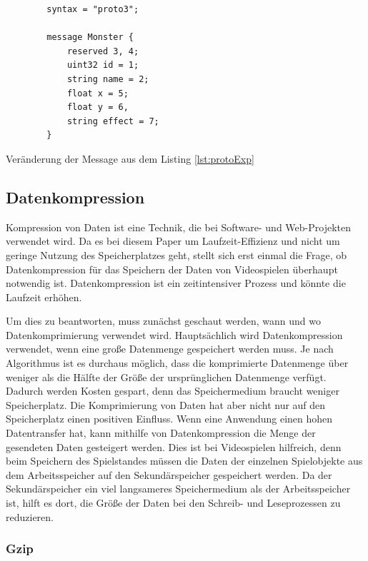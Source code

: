 \begin{listing}[htp]
    \begin{verbatim} 
        syntax = "proto3";
        
        message Monster {
            reserved 3, 4; 
            uint32 id = 1;
            string name = 2;
            float x = 5;
            float y = 6,
            string effect = 7;
        }
    \end{verbatim}
    \caption{Veränderung der Message aus dem Listing \ref{lst:protoExp}}
    \label{lst:protoReserved}
\end{listing}


\subsection{Datenkompression} \label{ssec:kompression}
Kompression von Daten ist eine Technik, die bei Software- und Web-Projekten verwendet wird. Da es bei diesem Paper um Laufzeit-Effizienz und nicht um geringe Nutzung des Speicherplatzes geht, stellt sich erst einmal die Frage, ob Datenkompression für das Speichern der Daten von Videospielen überhaupt notwendig ist. Datenkompression ist ein zeitintensiver Prozess und könnte die Laufzeit erhöhen.

Um dies zu beantworten, muss zunächst geschaut werden, wann und wo Datenkomprimierung verwendet wird. Hauptsächlich wird Datenkompression verwendet, wenn eine große Datenmenge gespeichert werden muss. Je nach Algorithmus ist es durchaus möglich, dass die komprimierte Datenmenge über weniger als die Hälfte der Größe der ursprünglichen Datenmenge verfügt. Dadurch werden Kosten gespart, denn das Speichermedium braucht weniger Speicherplatz. Die Komprimierung von Daten hat aber nicht nur auf den Speicherplatz einen positiven Einfluss. Wenn eine Anwendung einen hohen Datentransfer hat, kann mithilfe von Datenkompression die Menge der gesendeten Daten gesteigert werden. Dies ist bei Videospielen hilfreich, denn beim Speichern des Spielstandes müssen die Daten der einzelnen Spielobjekte aus dem Arbeitsspeicher auf den Sekundärspeicher gespeichert werden. Da der Sekundärspeicher ein viel langsameres Speichermedium als der Arbeitsspeicher ist, hilft es dort, die Größe der Daten bei den Schreib- und Leseprozessen zu reduzieren.\cite{mediumWhenDataCompression}

\subsubsection{Gzip}

